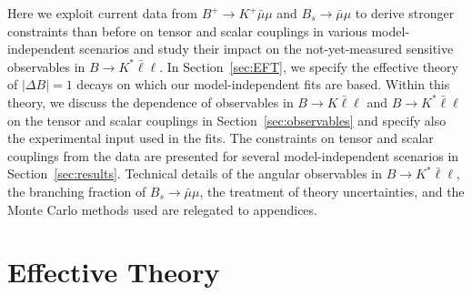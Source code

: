\documentclass[twocolumn,epjc3]{svjour3}
\numberwithin{equation}{section}
\def \refsec#1{Section~\ref{#1}}
\newcommand{\checked}[1]{{\color{brown}{ {\bf Checked: }{#1}}}}
\renewcommand{\checked}[1]{#1}
\renewcommand{\[}{\big[}
\renewcommand{\]}{\big]}
\renewcommand{\(}{\big(}
\renewcommand{\)}{\big)}
\begin{document}
Here we exploit current data from $B^+\to K^+ \bar\mu\mu$ and $B_s\to
\bar\mu\mu$ to derive stronger constraints than before on tensor and scalar
couplings in various model-independent scenarios and study their impact on the
not-yet-measured sensitive observables in $B\to K^* \bar\ell\ell$. In
\refsec{sec:EFT}, we specify the effective theory of $|\Delta B| = 1$ decays on
which our model-independent fits are based. Within this theory, we discuss the
dependence of observables in $B\to K \bar\ell\ell$ and $B\to K^* \bar\ell\ell$
on the tensor and scalar couplings in \refsec{sec:observables} and specify also
the experimental input used in the fits. The constraints on tensor and scalar
couplings from the data are presented for several model-independent scenarios in
\refsec{sec:results}.  Technical details of the angular observables in $B\to K^*
\bar\ell\ell$, the branching fraction of $B_s\to \bar\mu\mu$, the treatment of
theory uncertainties, and the Monte Carlo methods used are relegated to
appendices.

%
%
%
\section{
  \checked{Effective Theory}
  \label{sec:EFT}
}
\end{document}
